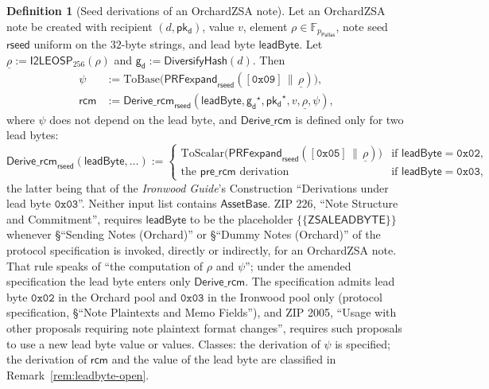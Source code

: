 \documentclass[11pt,a4paper]{article}
\theoremstyle{definition}
\newtheorem{definition}[theorem]{Definition}
\newcommand{\F}{\mathbb{F}}
\newcommand{\Pallas}{\ensuremath{\mathsf{Pallas}}}
\newcommand{\pkd}{\ensuremath{\mathsf{pk_d}}}
\newcommand{\gd}{\ensuremath{\mathsf{g_d}}}
\newcommand{\rcm}{\ensuremath{\mathsf{rcm}}}
\begin{document}
\begin{definition}[Seed derivations of an OrchardZSA note]
\label{def:zsa-seed}
Let an OrchardZSA note be created with recipient $(d, \pkd)$, value $v$,
element $\rho \in \F_{p_{\Pallas}}$, note seed $\mathsf{rseed}$ uniform on
the $32$-byte strings, and lead byte $\mathsf{leadByte}$. Let
$\underline{\rho} := \mathsf{I2LEOSP}_{256}(\rho)$ and
$\gd := \mathsf{DiversifyHash}(d)$. Then
\begin{align*}
  \psi &:= \mathrm{ToBase}\bigl(\mathsf{PRFexpand}_{\mathsf{rseed}}(
    [\mathtt{0x09}] \,\|\, \underline{\rho})\bigr), \\
  \rcm &:= \mathsf{Derive\_rcm}_{\mathsf{rseed}}(\mathsf{leadByte},
    \gd^{\star}, \pkd^{\star}, v, \underline{\rho}, \psi),
\end{align*}
where $\psi$ does not depend on the lead byte, and
$\mathsf{Derive\_rcm}$ is defined only for two lead bytes:
\[
  \mathsf{Derive\_rcm}_{\mathsf{rseed}}(\mathsf{leadByte}, \dots) :=
  \begin{cases}
    \mathrm{ToScalar}\bigl(\mathsf{PRFexpand}_{\mathsf{rseed}}(
      [\mathtt{0x05}] \,\|\, \underline{\rho})\bigr)
      & \text{if } \mathsf{leadByte} = \mathtt{0x02}, \\
    \text{the } \mathsf{pre\_rcm} \text{ derivation}
      & \text{if } \mathsf{leadByte} = \mathtt{0x03},
  \end{cases}
\]
the latter being that of the \emph{Ironwood Guide}'s Construction
``Derivations under lead byte $\mathtt{0x03}$''. Neither input list
contains $\mathsf{AssetBase}$. ZIP 226, ``Note Structure and Commitment'',
requires $\mathsf{leadByte}$ to be the placeholder
$\{\{\mathsf{ZSALEADBYTE}\}\}$ whenever \S``Sending Notes (Orchard)'' or
\S``Dummy Notes (Orchard)'' of the protocol specification is invoked,
directly or indirectly, for an OrchardZSA note. That rule speaks of ``the
computation of $\rho$ and $\psi$''; under the amended specification the lead
byte enters only $\mathsf{Derive\_rcm}$. The specification admits lead byte
$\mathtt{0x02}$ in the Orchard pool and $\mathtt{0x03}$ in the Ironwood pool
only (protocol specification, \S``Note Plaintexts and Memo Fields''), and
ZIP 2005, ``Usage with other proposals requiring note plaintext format
changes'', requires such proposals to use a new lead byte value or values.
Classes: the derivation of $\psi$ is specified; the derivation of $\rcm$ and
the value of the lead byte are classified in Remark~\ref{rem:leadbyte-open}.
\end{definition}
\end{document}
